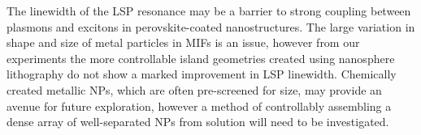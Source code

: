 The linewidth of the LSP resonance may be a barrier to strong coupling between plasmons and excitons in perovskite-coated nanostructures. The large variation in shape and size of metal particles in MIFs is an issue, however from our experiments the more controllable island geometries created using nanosphere lithography do not show a marked improvement in LSP linewidth. Chemically created metallic NPs, which are often pre-screened for size, may provide an avenue for future exploration, however a method of controllably assembling a dense array of well-separated NPs from solution will need to be investigated.
